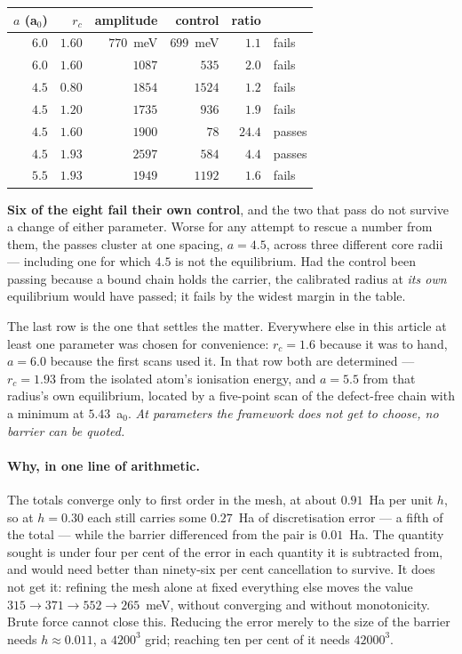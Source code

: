 \documentclass[11pt]{article}
\begin{document}
\begin{center}
\small
\begin{tabular}{@{}rrrrrl@{}}
\toprule
$a$ (a$_0$) & $r_c$ & amplitude & control & ratio & \\
\midrule
$6.0$ & $1.60$ & $\phantom{0}770$~meV & $699$~meV & $\phantom{0}1.1$ & fails\\
$6.0$ & $1.60$ & $1087$ & $535$ & $\phantom{0}2.0$ & fails\\
$4.5$ & $0.80$ & $1854$ & $1524$ & $\phantom{0}1.2$ & fails\\
$4.5$ & $1.20$ & $1735$ & $936$ & $\phantom{0}1.9$ & fails\\
$4.5$ & $1.60$ & $1900$ & $\phantom{00}78$ & $24.4$ & passes\\
$4.5$ & $1.93$ & $2597$ & $584$ & $\phantom{0}4.4$ & passes\\
$5.5$ & $1.93$ & $1949$ & $1192$ & $\phantom{0}1.6$ & fails\\
\bottomrule
\end{tabular}
\end{center}

\noindent \textbf{Six of the eight fail their own control}, and the two that pass do not survive a
change of either parameter. Worse for any attempt to rescue a number from them, the passes cluster
at one spacing, $a=4.5$, across three different core radii --- including one for which $4.5$ is not
the equilibrium. Had the control been passing because a bound chain holds the carrier, the
calibrated radius at \emph{its own} equilibrium would have passed; it fails by the widest margin in
the table.

The last row is the one that settles the matter. Everywhere else in this article at least one
parameter was chosen for convenience: $r_c=1.6$ because it was to hand, $a=6.0$ because the first
scans used it. In that row both are determined --- $r_c=1.93$ from the isolated atom's ionisation
energy, and $a=5.5$ from that radius's own equilibrium, located by a five-point scan of the
defect-free chain with a minimum at $5.43$~a$_0$. \emph{At parameters the framework does not get to
choose, no barrier can be quoted.}

\paragraph{Why, in one line of arithmetic.} The totals converge only to first order in the mesh, at
about $0.91$~Ha per unit $h$, so at $h=0.30$ each still carries some $0.27$~Ha of discretisation
error --- a fifth of the total --- while the barrier differenced from the pair is $0.01$~Ha. The
quantity sought is under four per cent of the error in each quantity it is subtracted from, and
would need better than ninety-six per cent cancellation to survive. It does not get it: refining the
mesh alone at fixed everything else moves the value $315\to371\to552\to265$~meV, without converging
and without monotonicity. Brute force cannot close this. Reducing the error merely to the size of
the barrier needs $h\approx0.011$, a $4200^3$ grid; reaching ten per cent of it needs $42000^3$.
\end{document}
